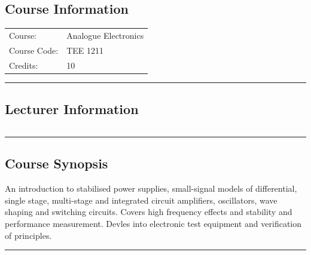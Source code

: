 
\subsection*{Course Information}\label{course:5224}
\vspace{0ex}%
\noindent\parbox{0.5\textwidth}{%
    \noindent\begin{tabular}{@{}ll}
                 \textsf{Course:}          & 	Analogue Electronics \\
                 \textsf{Course Code:}         & 	TEE  1211   \\
                 \textsf{Credits:}    & 	10
    \end{tabular}}
\vspace{2ex}\hrule\vspace{2ex}

\subsection*{Lecturer Information}
\noindent\parbox{0.5\textwidth}{%
    \noindent\begin{tabular}{@{}ll}
                 
    \end{tabular}}
\vspace{2ex}\hrule\vspace{2ex}

\subsection*{Course Synopsis}
An introduction to stabilised power supplies, small-signal models of differential, single stage, multi-stage and integrated circuit amplifiers, oscillators, wave shaping and switching circuits.
Covers high frequency effects and stability and performance measurement.
Devles into electronic test equipment and verification of principles.
\vspace{2ex} \hrule\vspace{2ex}

